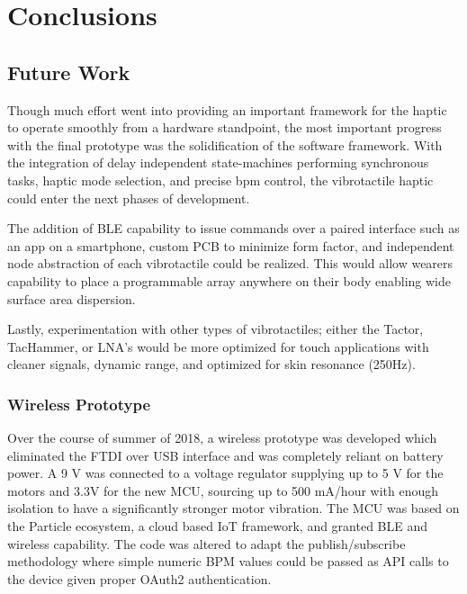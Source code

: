 
\chapter{Conclusions} \label{chapConclusions}


\section{Future Work}
Though much effort went into providing an important framework for the haptic to operate smoothly from a hardware standpoint, the most important progress with the final prototype was the solidification of the software framework. With the integration of delay independent state-machines performing synchronous tasks, haptic mode selection, and precise bpm control, the vibrotactile haptic could enter the next phases of development. 

The addition of BLE capability to issue commands over a paired interface such as an app on a smartphone, custom PCB to minimize form factor, and independent node abstraction of each vibrotactile could be realized. This would allow wearers capability to place a programmable array anywhere on their body enabling wide surface area dispersion. 

Lastly, experimentation with other types of vibrotactiles; either the Tactor, TacHammer, or LNA's would be more optimized for touch applications with cleaner signals, dynamic range, and optimized for skin resonance (250Hz).

\subsection{Wireless Prototype}
Over the course of summer of 2018, a wireless prototype was developed which eliminated the FTDI over USB interface and was completely reliant on battery power. A 9 V was connected to a voltage regulator supplying up to 5 V for the motors and 3.3V for the new MCU, sourcing up to 500 mA/hour with enough isolation to have a significantly stronger motor vibration. The MCU was based on the Particle ecosystem, a cloud based IoT framework, and granted BLE and wireless capability. The code was altered to adapt the publish/subscribe methodology where simple numeric BPM values could be passed as API calls to the device given proper OAuth2 authentication. 


